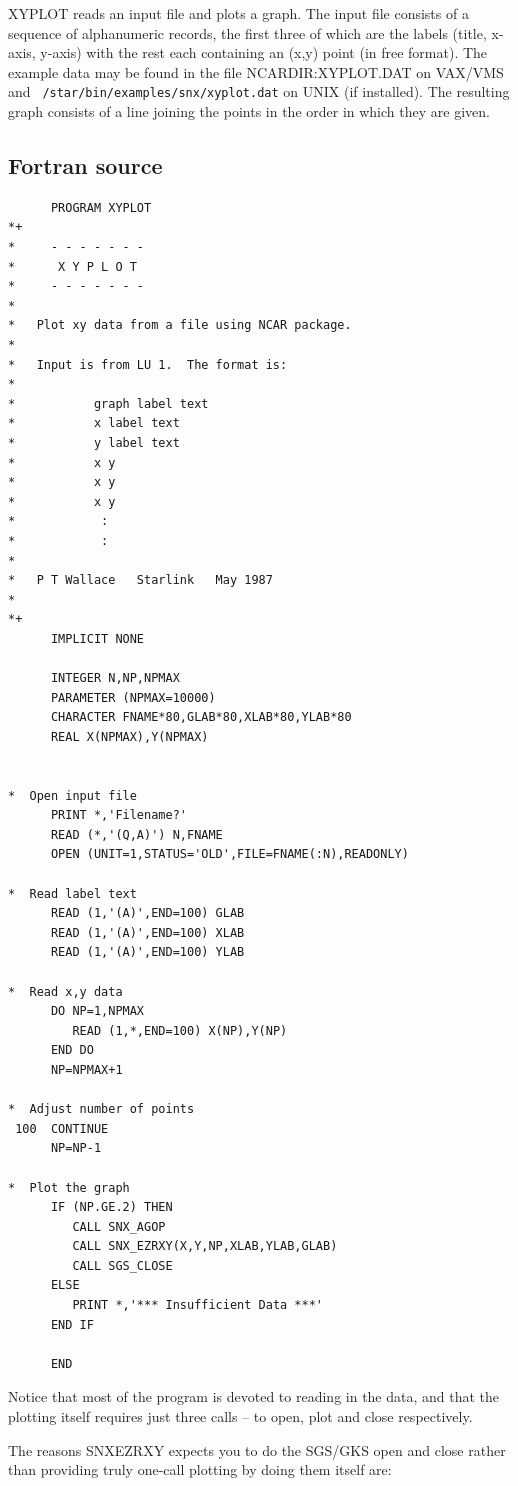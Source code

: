 \documentclass[twoside,11pt]{article}
\renewcommand{\_}{\texttt{\symbol{95}}}
\begin{document}
\sloppypar
XYPLOT reads an input file and plots a graph.  The input file consists
of a sequence of alphanumeric records, the first three of which are the
labels (title, x-axis, y-axis) with the rest each containing an (x,y)
point (in free format).  The example data may be found in the file
NCAR\_DIR:XYPLOT.DAT on VAX/VMS and {\tt
/star/\-bin/\-examples/\-snx/xyplot.dat} on UNIX (if installed).  The
resulting graph consists of a line joining the points in the order in
which they are given.

\subsection {Fortran source}

\small
\begin{verbatim}
      PROGRAM XYPLOT
*+
*     - - - - - - -
*      X Y P L O T
*     - - - - - - -
*
*   Plot xy data from a file using NCAR package.
*
*   Input is from LU 1.  The format is:
*
*           graph label text
*           x label text
*           y label text
*           x y
*           x y
*           x y
*            :
*            :
*
*   P T Wallace   Starlink   May 1987
*
*+
      IMPLICIT NONE

      INTEGER N,NP,NPMAX
      PARAMETER (NPMAX=10000)
      CHARACTER FNAME*80,GLAB*80,XLAB*80,YLAB*80
      REAL X(NPMAX),Y(NPMAX)


*  Open input file
      PRINT *,'Filename?'
      READ (*,'(Q,A)') N,FNAME
      OPEN (UNIT=1,STATUS='OLD',FILE=FNAME(:N),READONLY)

*  Read label text
      READ (1,'(A)',END=100) GLAB
      READ (1,'(A)',END=100) XLAB
      READ (1,'(A)',END=100) YLAB

*  Read x,y data
      DO NP=1,NPMAX
         READ (1,*,END=100) X(NP),Y(NP)
      END DO
      NP=NPMAX+1

*  Adjust number of points
 100  CONTINUE
      NP=NP-1

*  Plot the graph
      IF (NP.GE.2) THEN
         CALL SNX_AGOP
         CALL SNX_EZRXY(X,Y,NP,XLAB,YLAB,GLAB)
         CALL SGS_CLOSE
      ELSE
         PRINT *,'*** Insufficient Data ***'
      END IF

      END
\end{verbatim}
\normalsize

Notice that most of the program is devoted to reading in the data, and that
the plotting itself requires just three calls -- to open, plot and close
respectively.

The reasons SNX\_EZRXY expects you to do the SGS/GKS open and close rather
than providing truly one-call plotting by doing them itself are:
\end{document}
